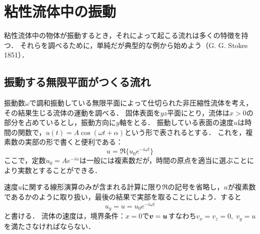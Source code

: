 \section{粘性流体中の振動}

粘性流体中の物体が振動するとき，それによって起こる流れは多くの特徴を持つ．
それらを調べるために，単純だが典型的な例から始めよう（G. G. Stokes 1851）．



\subsection*{振動する無限平面がつくる流れ}

振動数$\omega$で調和振動している無限平面によって仕切られた非圧縮性流体を考え，その結果生じる流体の運動を調べる．
固体表面を$yz$平面にとり，流体は$x>0$の部分を占めているとし，振動方向に$y$軸をとる．
振動している表面の速度$u$は時間の関数で，$u(t)=A\cos(\omega t+\alpha)$という形で表されるとする．
これを，複素数の実部の形で書くと便利である：
\[
    u = \Re \{ u_0 e^{-i\omega t}\}
\]
ここで，定数$u_0 = A e^{-i\alpha}$は一般には複素数だが，時間の原点を適当に選ぶことにより実数とすることができる．


速度$u$に関する線形演算のみが含まれる計算に限り$\Re$の記号を省略し，$u$が複素数であるかのように取り扱い，最後の結果で実部を取ることにしよう．すると
\begin{equation}
    u_y = u = u_0 e^{-i\omega t}
\end{equation}
と書ける．
流体の速度は，境界条件：$x=0$で$\vb*{v}=\vb*{u}$すなわち$v_x=v_z=0, \; v_y=u$を満たさなければならない．

